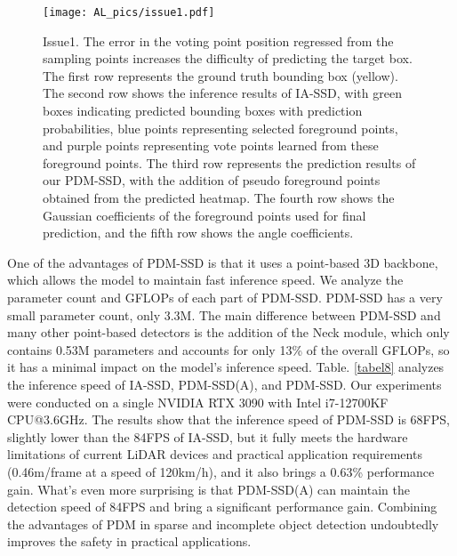 \begin{figure}
	\centering
	\texttt{[image: AL\_pics/issue1.pdf]}
	\caption{Issue1. The error in the voting point position regressed from the sampling points increases the difficulty of predicting the target box. The first row represents the ground truth bounding box (yellow). The second row shows the inference results of IA-SSD, with green boxes indicating predicted bounding boxes with prediction probabilities, blue points representing selected foreground points, and purple points representing vote points learned from these foreground points. The third row represents the prediction results of our PDM-SSD, with the addition of pseudo foreground points obtained from the predicted heatmap. The fourth row shows the Gaussian coefficients of the foreground points used for final prediction, and the fifth row shows the angle coefficients.}
	\label{fig:issue1}
\end{figure}



One of the advantages of PDM-SSD is that it uses a point-based 3D backbone, which allows the model to maintain fast inference speed. We analyze the parameter count and GFLOPs of each part of PDM-SSD. PDM-SSD has a very small parameter count, only 3.3M. The main difference between PDM-SSD and many other point-based detectors is the addition of the Neck module, which only contains 0.53M parameters and accounts for only 13\% of the overall GFLOPs, so it has a minimal impact on the model's inference speed. Table. \ref{tabel8} analyzes the inference speed of IA-SSD, PDM-SSD(A), and PDM-SSD. Our experiments were conducted on a single NVIDIA RTX 3090 with Intel i7-12700KF CPU@3.6GHz. The results show that the inference speed of PDM-SSD is 68FPS, slightly lower than the 84FPS of IA-SSD, but it fully meets the hardware limitations of current LiDAR devices and practical application requirements (0.46m/frame at a speed of 120km/h), and it also brings a 0.63\% performance gain. What's even more surprising is that PDM-SSD(A) can maintain the detection speed of 84FPS and bring a significant performance gain. Combining the advantages of PDM in sparse and incomplete object detection undoubtedly improves the safety in practical applications.

%
